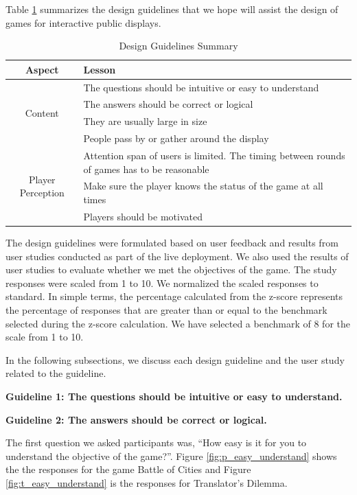 \documentclass{sig-alternate}
\begin{document}
Table \ref{table:design_guidlines_summary} summarizes the design guidelines that we hope will assist the design of games for interactive public displays.

\begin{table}[ht]
	\label{table:design_guidlines_summary}
	\begin{tabular*}{1\textwidth}{c | l}
 		\hline
		Aspect & Lesson\\ \hline
  		\multirow{4}{*}{Content} & The questions should be intuitive or easy to understand\\
 			& The answers should be correct or logical\\
 			& They are usually large in size\\
 			& People pass by or gather around the display\\ \hline
		\multirow{4}{*}{Player Perception} & Attention span of users is limited. The timing between rounds of games has to be reasonable
\\
 			& Make sure the player knows the status of the game at all times\\
 			& Players should be motivated\\ \hline	
	\end{tabular*}
	\caption{Design Guidelines Summary}
\end{table}

The design guidelines were formulated based on user feedback and results from user studies conducted as part of the live deployment. We also used the results of user studies to evaluate whether we met the objectives of the game. The study responses were scaled from 1 to 10. We normalized the scaled responses to standard\cite{laerd:standard_score}. In simple terms, the percentage calculated from the z-score represents the percentage of responses that are greater than or equal to the benchmark selected during the z-score calculation. We have selected a benchmark of 8 for the scale from 1 to 10.

In the following subsections, we discuss each design guideline and the user study related to the guideline.

\textbf{Guideline 1: The questions should be intuitive or easy to understand.}

\textbf{Guideline 2: The answers should be correct or logical.}

The first question we asked participants was, ``How easy is it for you to understand the objective of the game?''. 
Figure \ref{fig:p_easy_understand} shows the the responses for the game Battle of Cities and Figure \ref{fig:t_easy_understand} is the responses for Translator's Dilemma. 
\end{document}
